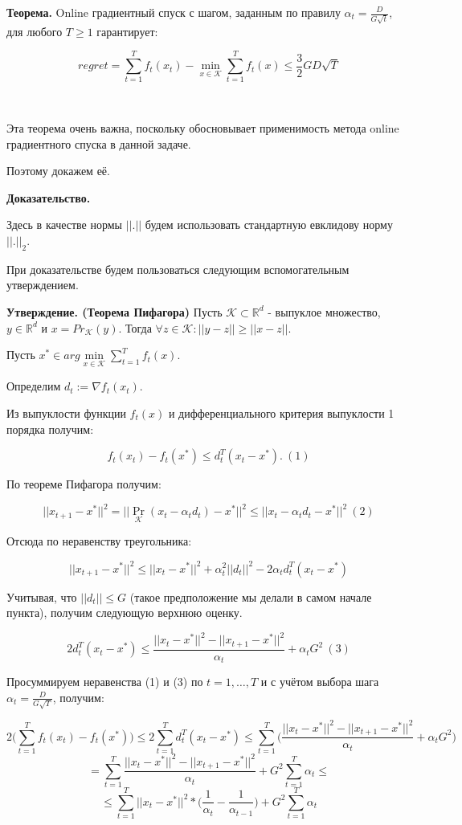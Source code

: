 \documentclass[12pt]{article}
\begin{document}
\textbf{Теорема.} Online градиентный спуск с шагом, заданным по правилу $\alpha_t = \frac{D}{G\sqrt{t}}$, для любого $T \geq 1$ гарантирует:

$$regret = \sum\limits_{t=1}^T f_t(x_t) - \min\limits_{x\in \mathcal{K}} \sum\limits_{t=1}^T f_t(x) \leq \frac{3}{2}GD\sqrt{T}$$

$ $

Эта теорема очень важна, поскольку обосновывает применимость метода online градиентного спуска в данной задаче.

Поэтому докажем её.

\textbf{Доказательство.}

Здесь в качестве нормы $||.||$ будем использовать стандартную евклидову норму $||.||_2$.

При доказательстве будем пользоваться следующим вспомогательным утверждением.

\textbf{Утверждение. (Теорема Пифагора)} Пусть $\mathcal{K} \subset \mathbb{R}^d$ - выпуклое множество, $y \in \mathbb{R}^d$ и $x=Pr_{\mathcal{K}}(y)$. Тогда $\forall z \in \mathcal{K}: ||y-z|| \geq ||x-z||$.

Пусть $x^* \in arg \min\limits_{x \in \mathcal{K}} \sum\limits_{t=1}^T f_t(x)$.

Определим $d_t := \nabla f_t(x_t)$.

Из выпуклости функции $f_t(x)$ и дифференциального критерия выпуклости 1 порядка получим:

$$f_t(x_t) - f_t(x^*) \leq d_t^T (x_t-x^*).\ (1)$$

По теореме Пифагора получим:

$$||x_{t+1}-x^*||^2 = ||\Pr_{\mathcal{K}}(x_t - \alpha_td_t) -x^*||^2 \leq ||x_t-\alpha_t d_t-x^*||^2\ (2)$$

Отсюда по неравенству треугольника:

$$||x_{t+1}-x^*||^2 \leq ||x_t-x^*||^2 + \alpha_t^2||d_t||^2 - 2\alpha_td_t^T(x_t-x^*)$$

Учитывая, что $||d_t|| \leq G$ (такое предположение мы делали в самом начале пункта), получим следующую верхнюю оценку.

$$2d_t^T(x_t-x^*) \leq \frac{||x_t-x^*||^2 - ||x_{t+1}-x^*||^2}{\alpha_t} + \alpha_t G^2\ (3)$$ 

Просуммируем неравенства (1) и (3) по $t=1, \dots, T$ и с учётом выбора шага $\alpha_t = \frac{D}{G\sqrt{T}}$, получим:

$$2\bigg(\sum\limits_{t=1}^T f_t(x_t) - f_t(x^*) \bigg) \leq 2\sum\limits_{t=1}^T d_t^T(x_t-x^*) \leq \sum\limits_{t=1}^T 
\bigg(\frac{||x_t-x^*||^2 - ||x_{t+1}-x^*||^2}{\alpha_t} + \alpha_t G^2\bigg)$$
$$= \sum\limits_{t=1}^T 
\frac{||x_t-x^*||^2 - ||x_{t+1}-x^*||^2}{\alpha_t} + G^2 \sum\limits_{t=1}^T \alpha_t \leq $$
$$\leq \sum\limits_{t=1}^T 
||x_t-x^*||^2*\bigg(\frac{1}{\alpha_t}-\frac{1}{\alpha_{t-1}}\bigg) + G^2 \sum\limits_{t=1}^T \alpha_t $$
\end{document}

